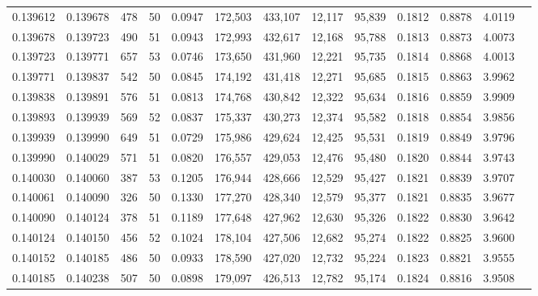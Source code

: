 \begin{tabular}{rrrrrrrrrrrrr}
0.139612 & 0.139678 &   478 &  50 &                                     0.0947 & 172,503 & 433,107 &  12,117 &  95,839 & 0.1812 & 0.8878 & 4.0119 \\
0.139678 & 0.139723 &   490 &  51 &                                     0.0943 & 172,993 & 432,617 &  12,168 &  95,788 & 0.1813 & 0.8873 & 4.0073 \\
0.139723 & 0.139771 &   657 &  53 &                                     0.0746 & 173,650 & 431,960 &  12,221 &  95,735 & 0.1814 & 0.8868 & 4.0013 \\
0.139771 & 0.139837 &   542 &  50 &                                     0.0845 & 174,192 & 431,418 &  12,271 &  95,685 & 0.1815 & 0.8863 & 3.9962 \\
0.139838 & 0.139891 &   576 &  51 &                                     0.0813 & 174,768 & 430,842 &  12,322 &  95,634 & 0.1816 & 0.8859 & 3.9909 \\
0.139893 & 0.139939 &   569 &  52 &                                     0.0837 & 175,337 & 430,273 &  12,374 &  95,582 & 0.1818 & 0.8854 & 3.9856 \\
0.139939 & 0.139990 &   649 &  51 &                                     0.0729 & 175,986 & 429,624 &  12,425 &  95,531 & 0.1819 & 0.8849 & 3.9796 \\
0.139990 & 0.140029 &   571 &  51 &                                     0.0820 & 176,557 & 429,053 &  12,476 &  95,480 & 0.1820 & 0.8844 & 3.9743 \\
0.140030 & 0.140060 &   387 &  53 &                                     0.1205 & 176,944 & 428,666 &  12,529 &  95,427 & 0.1821 & 0.8839 & 3.9707 \\
0.140061 & 0.140090 &   326 &  50 &                                     0.1330 & 177,270 & 428,340 &  12,579 &  95,377 & 0.1821 & 0.8835 & 3.9677 \\
0.140090 & 0.140124 &   378 &  51 &                                     0.1189 & 177,648 & 427,962 &  12,630 &  95,326 & 0.1822 & 0.8830 & 3.9642 \\
0.140124 & 0.140150 &   456 &  52 &                                     0.1024 & 178,104 & 427,506 &  12,682 &  95,274 & 0.1822 & 0.8825 & 3.9600 \\
0.140152 & 0.140185 &   486 &  50 &                                     0.0933 & 178,590 & 427,020 &  12,732 &  95,224 & 0.1823 & 0.8821 & 3.9555 \\
0.140185 & 0.140238 &   507 &  50 &                                     0.0898 & 179,097 & 426,513 &  12,782 &  95,174 & 0.1824 & 0.8816 & 3.9508 \\

\end{tabular}
